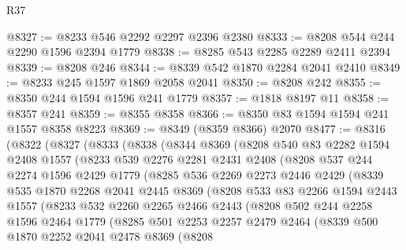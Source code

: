 \begin{lexlean}{R37}
\begin{coremodule}
@8327 := @8233 @546 @2292 @2297 @2396 @2380
@8333 := @8208 @544 @244 @2290 @1596 @2394 @1779
@8338 := @8285 @543 @2285 @2289 @2411 @2394
@8339 := @8208 @246
@8344 := @8339 @542 @1870 @2284 @2041 @2410
@8349 := @8233 @245 @1597 @1869 @2058 @2041
@8350 := @8208 @242
@8355 := @8350 @244 @1594 @1596 @241 @1779
@8357 := @1818 @8197 @11
@8358 := @8357 @241
@8359 := @8355 @8358
@8366 := @8350 @83 @1594 @1594 @241 @1557 @8358 @8223
@8369 := @8349 (@8359 @8366) @2070
@8477 := @8316
    (@8322
      (@8327
        (@8333
          (@8338
            (@8344
              @8369
              (@8208
                @540
                @83
                @2282
                @1594
                @2408
                @1557
                (@8233
                  @539
                  @2276
                  @2281
                  @2431
                  @2408
                  (@8208
                    @537
                    @244
                    @2274
                    @1596
                    @2429
                    @1779
                    (@8285
                      @536
                      @2269
                      @2273
                      @2446
                      @2429
                      (@8339
                        @535
                        @1870
                        @2268
                        @2041
                        @2445
                        @8369
                        (@8208
                          @533
                          @83
                          @2266
                          @1594
                          @2443
                          @1557
                          (@8233
                            @532
                            @2260
                            @2265
                            @2466
                            @2443
                            (@8208
                              @502
                              @244
                              @2258
                              @1596
                              @2464
                              @1779
                              (@8285
                                @501
                                @2253
                                @2257
                                @2479
                                @2464
                                (@8339
                                  @500
                                  @1870
                                  @2252
                                  @2041
                                  @2478
                                  @8369
                                  (@8208

\end{coremodule}
\end{lexlean}
